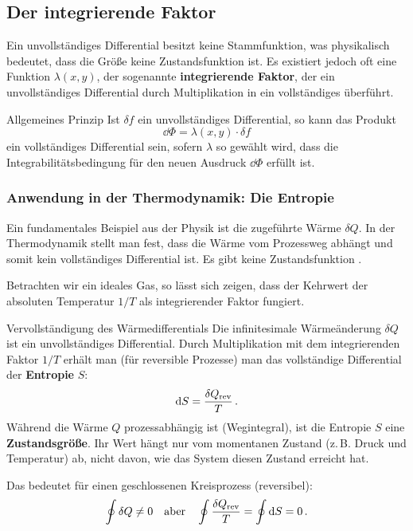 \subsection{Der integrierende Faktor}\label{subsec: integrierender_Faktor}
Ein unvollständiges Differential besitzt keine Stammfunktion, was physikalisch bedeutet, dass die Größe keine Zustandsfunktion ist. Es existiert jedoch oft eine Funktion $\lambda(x,y)$, der sogenannte \textbf{integrierende Faktor}, der ein unvollständiges Differential durch Multiplikation in ein vollständiges überführt.

\begin{rememberbox}{Allgemeines Prinzip}
Ist $\delta f$ ein unvollständiges Differential, so kann das Produkt 
\begin{equation}\label{eq: definition_integrierender_faktor}
    \dd \Phi = \lambda(x,y) \cdot \delta f
\end{equation}
ein vollständiges Differential sein, sofern $\lambda$ so gewählt wird, dass die Integrabilitätsbedingung für den neuen Ausdruck $\dd \Phi$ erfüllt ist.
\end{rememberbox}

\subsubsection{Anwendung in der Thermodynamik: Die Entropie}\label{subsubsec: thermodynamik_entropie}
Ein fundamentales Beispiel aus der Physik ist die zugeführte Wärme $\delta Q$. In der Thermodynamik stellt man fest, dass die Wärme vom Prozessweg abhängt und somit kein vollständiges Differential ist. Es gibt keine Zustandsfunktion .

Betrachten wir ein ideales Gas, so lässt sich zeigen, dass der Kehrwert der absoluten Temperatur $1/T$ als integrierender Faktor fungiert.

\begin{importantbox}{Vervollständigung des Wärmedifferentials}
Die infinitesimale Wärmeänderung $\delta Q$ ist ein unvollständiges Differential. Durch Multiplikation mit dem integrierenden Faktor $1/T$ erhält man (für reversible Prozesse) man das vollständige Differential der \textbf{Entropie} $S$:
\begin{equation}\label{eq: definition_entropie_differential}
    \mathrm{d} S = \frac{\delta Q_{\text{rev}}}{T} \,.
\end{equation}
Während die Wärme $Q$ prozessabhängig ist (Wegintegral), ist die Entropie $S$ eine \textbf{Zustandsgröße}. Ihr Wert hängt nur vom momentanen Zustand (z.\,B. Druck und Temperatur) ab, nicht davon, wie das System diesen Zustand erreicht hat.
\end{importantbox}

Das bedeutet für einen geschlossenen Kreisprozess (reversibel):
\begin{equation}
    \oint \delta Q \neq 0 \quad \text{aber} \quad \oint \frac{\delta Q_{\text{rev}}}{T} = \oint \mathrm{d} S = 0 \,.
\end{equation}

\newpage